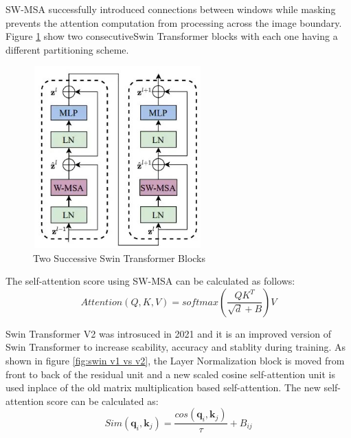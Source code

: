 SW-MSA successfully introduced connections between windows while masking prevents the attention computation from processing across the image boundary. Figure \ref{fig:2swins} show two consecutiveSwin Transformer blocks with each one having a different partitioning scheme.
\FloatBarrier
\begin{figure}[ht]
\includegraphics[width=6.5cm, height=7cm]{images/swin-architecture.jpg}
\centering
\caption{Two Successive Swin Transformer Blocks \protect\cite{swin-v1}}
\label{fig:2swins}
\end{figure}

The self-attention score using SW-MSA can be calculated as follows:
\begin{equation}
    Attention(Q,K,V) = softmax(\frac{QK^T}{\sqrt{d}+B})V
\end{equation}

Swin Transformer V2 \cite{swin-v2} was introsuced in 2021 and it is an improved version of Swin Transformer to increase scability, accuracy and stablity during training. As shown in figure \ref{fig:swin v1 vs v2}, the Layer Normalization block is moved from front to back of the residual unit and a new scaled cosine self-attention unit is used inplace of the old matrix multiplication based self-attention. The new self-attention score can be calculated as:
\begin{equation}
    Sim(\mathbf{q}_i,\mathbf{k}_j) = \frac{cos(\mathbf{q}_i,\mathbf{k}_j)}{\tau} + B_{ij}
\end{equation}

